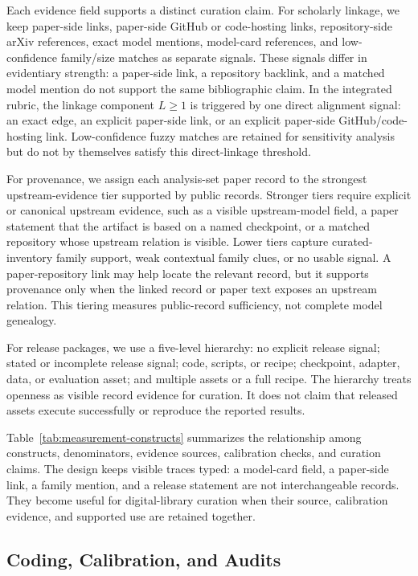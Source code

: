 Each evidence field supports a distinct curation claim. For scholarly linkage, we keep paper-side \hf links, paper-side GitHub or code-hosting links, repository-side arXiv references, exact model mentions, model-card references, and low-confidence family/size matches as separate signals. These signals differ in evidentiary strength: a paper-side link, a repository backlink, and a matched model mention do not support the same bibliographic claim. In the integrated rubric, the linkage component $L\geq1$ is triggered by one direct alignment signal: an exact \hf edge, an explicit paper-side \hf link, or an explicit paper-side GitHub/code-hosting link. Low-confidence fuzzy matches are retained for sensitivity analysis but do not by themselves satisfy this direct-linkage threshold.

For provenance, we assign each analysis-set paper record to the strongest upstream-evidence tier supported by public records. Stronger tiers require explicit or canonical upstream evidence, such as a visible upstream-model field, a paper statement that the artifact is based on a named checkpoint, or a matched repository whose upstream relation is visible. Lower tiers capture curated-inventory family support, weak contextual family clues, or no usable signal. A paper-repository link may help locate the relevant record, but it supports provenance only when the linked record or paper text exposes an upstream relation. This tiering measures public-record sufficiency, not complete model genealogy.

For release packages, we use a five-level hierarchy: no explicit release signal; stated or incomplete release signal; code, scripts, or recipe; checkpoint, adapter, data, or evaluation asset; and multiple assets or a full recipe. The hierarchy treats openness as visible record evidence for curation. It does not claim that released assets execute successfully or reproduce the reported results.

Table~\ref{tab:measurement-constructs} summarizes the relationship among constructs, denominators, evidence sources, calibration checks, and curation claims. The design keeps visible traces typed: a model-card field, a paper-side link, a family mention, and a release statement are not interchangeable records. They become useful for digital-library curation when their source, calibration evidence, and supported use are retained together.

\subsection{Coding, Calibration, and Audits}

